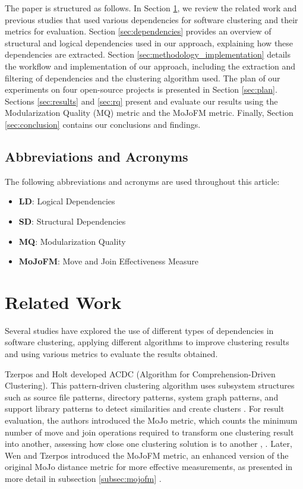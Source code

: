 \documentclass{ieeeaccess}
\begin{document}
The paper is structured as follows. In Section \ref{sec:related_work}, we review the related work and previous studies that used various dependencies for software clustering and their metrics for evaluation.
Section \ref{sec:dependencies} provides an overview of structural and logical dependencies used in our approach, explaining how these dependencies are extracted.
Section \ref{sec:methodology_implementation} details the workflow and implementation of our approach, including the extraction and filtering of dependencies and the clustering algorithm used.
The plan of our experiments on four open-source projects is presented in Section \ref{sec:plan}. Sections \ref{sec:results} and \ref{sec:rq} present and evaluate our results using the Modularization Quality (MQ) metric and the MoJoFM metric. 
Finally, Section \ref{sec:conclusion} contains our conclusions and findings.

\subsection{Abbreviations and Acronyms}

The following abbreviations and acronyms are used throughout this article:

\begin{itemize}
    \item \textbf{LD}: Logical Dependencies
    \item \textbf{SD}: Structural Dependencies
    \item \textbf{MQ}: Modularization Quality
    \item \textbf{MoJoFM}: Move and Join Effectiveness Measure
\end{itemize}

\section{Related Work}
\label{sec:related_work}

Several studies have explored the use of different types of dependencies in software clustering, applying different algorithms to improve clustering results and using various metrics to evaluate the results obtained.

Tzerpos and Holt developed ACDC (Algorithm for Comprehension-Driven Clustering). This pattern-driven clustering algorithm uses subsystem structures such as source file patterns, directory patterns, system graph patterns, and support library patterns to detect similarities and create clusters \cite{acdc}. For result evaluation, the authors introduced the MoJo metric, which counts the minimum number of move and join operations required to transform one clustering result into another, assessing how close one clustering solution is to another \cite{b3}, \cite{tzerpos1}. Later, Wen and Tzerpos introduced the MoJoFM metric, an enhanced version of the original MoJo distance metric for more effective measurements, as presented in more detail in subsection \ref{subsec:mojofm} \cite{mojofm}.
\end{document}

